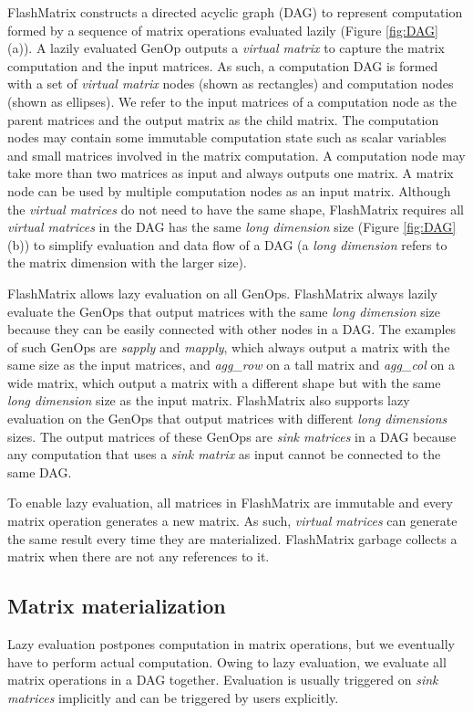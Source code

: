 FlashMatrix constructs a directed acyclic graph (DAG) \cite{} to represent
computation formed by a sequence of matrix operations evaluated lazily
(Figure \ref{fig:DAG} (a)). A lazily evaluated GenOp outputs a \textit{virtual matrix}
to capture the matrix computation and the input matrices. As such, a computation
DAG is formed with a set of \textit{virtual matrix} nodes (shown as rectangles)
and computation nodes (shown as ellipses). We refer to the input matrices of
a computation node as the parent matrices and the output matrix as the child matrix.
The computation nodes may contain some immutable computation state such as
scalar variables and small matrices involved in the matrix computation.
A computation node may take more than two matrices as input and always outputs
one matrix. A matrix node can be used by multiple computation nodes as
an input matrix. Although the \textit{virtual matrices} do not need to have
the same shape, FlashMatrix requires all \textit{virtual matrices} in the DAG
has the same \textit{long dimension} size (Figure \ref{fig:DAG} (b)) to
simplify evaluation and data flow of a DAG (a \textit{long dimension}
refers to the matrix dimension with the larger size).

FlashMatrix allows lazy evaluation on all GenOps.
FlashMatrix always lazily evaluate the GenOps that output matrices with
the same \textit{long dimension} size because they can be easily connected
with other nodes in a DAG. The examples of such GenOps are \textit{sapply}
and \textit{mapply}, which always output a matrix with the same size as
the input matrices, and \textit{agg\_row} on a tall matrix and \textit{agg\_col}
on a wide matrix, which output a matrix with a different shape but with
the same \textit{long dimension} size as the input matrix. FlashMatrix also
supports lazy evaluation on the GenOps that output matrices with different
\textit{long dimensions} sizes. The output matrices of these GenOps are
\textit{sink matrices} in a DAG because any computation
that uses a \textit{sink matrix} as input cannot be connected to the same DAG.

To enable lazy evaluation, all matrices in FlashMatrix are immutable and every
matrix operation generates a new matrix. As such, \textit{virtual matrices}
can generate the same result every time they are materialized. FlashMatrix
garbage collects a matrix when there are not any references to it.

\subsection{Matrix materialization} \label{sec:materialize}
Lazy evaluation postpones computation in matrix operations, but we eventually
have to perform actual computation. Owing to lazy evaluation,
we evaluate all matrix operations in a DAG together. Evaluation is
usually triggered on \textit{sink matrices} implicitly and can be triggered
by users explicitly.

